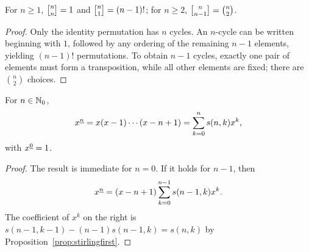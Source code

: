 \documentclass[11pt, oneside]{article}
\begin{document}
\begin{proposition}
For $n\ge1$, $\stirone{n}{n}=1$ and $\stirone{n}{1}=(n-1)!$; for $n\ge2$, $\stirone{n}{n-1}=\binom n2$.
\end{proposition}
\begin{proof}
Only the identity permutation has $n$ cycles. An $n$-cycle can be written beginning with $1$, followed by any ordering of the remaining $n-1$ elements, yielding $(n-1)!$ permutations. To obtain $n-1$ cycles, exactly one pair of elements must form a transposition, while all other elements are fixed; there are $\binom n2$ choices.
\end{proof}

\begin{proposition}\label{prop:fallstir}
For $n\in\mathbb{N}_0$,
\[
x^{\underline{n}}=x(x-1)\cdots(x-n+1)=\sum_{k=0}^ns(n, k)x^k,
\]
with $x^{\underline{0}}=1$.
\end{proposition}
\begin{proof}
The result is immediate for $n=0$. If it holds for $n-1$, then
\[
x^{\underline{n}}=(x-n+1)\sum_{k=0}^{n-1}s(n-1, k)x^k.
\]
The coefficient of $x^k$ on the right is $s(n-1, k-1)-(n-1)s(n-1, k)=s(n, k)$ by Proposition~\ref{prop:stirlingfirst}.
\end{proof}
\end{document}
